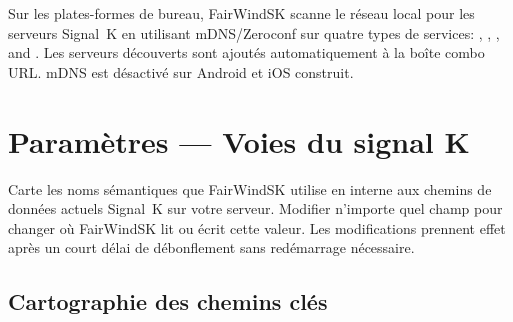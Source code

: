 Sur les plates-formes de bureau, FairWindSK scanne le réseau local pour les serveurs Signal~K en utilisant
mDNS/Zeroconf sur quatre types de services:
, , ,
and .
Les serveurs découverts sont ajoutés automatiquement à la boîte combo URL.
mDNS est désactivé sur Android et iOS construit.

\chapter{Paramètres --- Voies du signal K}
\label{ch:settings-signalk}

Carte les noms sémantiques que FairWindSK utilise en interne aux chemins de données actuels Signal~K
sur votre serveur.
Modifier n'importe quel champ pour changer où FairWindSK lit ou écrit cette valeur.
Les modifications prennent effet après un court délai de débonflement sans redémarrage nécessaire.


\section{Cartographie des chemins clés}

